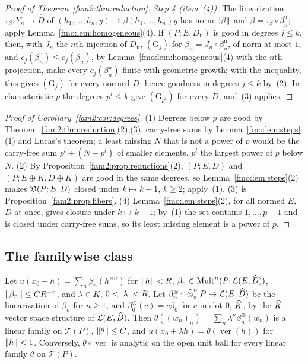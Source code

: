\begin{proof}[Proof of Theorem~\ref{fam2:thm:reduction}]
\emph{Step 4 (item~(4)).} The linearization $\tau_\beta\colon Y_n\to\widehat D$ of $(h_1,\dots,h_n,y)\mapsto
\beta(h_1,\dots,h_n)y$ has norm $\lVert \beta\rVert$ and $\beta=\tau_\beta\circ\beta^{\mathrm u}_n$; apply
Lemma~\ref{fmo:lem:homogeneous}(4). If $(P;E,D_{\mathrm u})$ is good in degrees $j\le k$, then, with $J_n$ the $n$th
injection of $D_{\mathrm u}$, $(\mathrm G_j)$ for $\beta_n=J_n\circ\beta^{\mathrm u}_n$, of norm at most $1$, and $c_j(\beta^{\mathrm u}_n)\le
c_j(\beta_n)$, by Lemma~\ref{fmo:lem:homogeneous}(4) with the $n$th projection, make every $c_j(\beta^{\mathrm u}_n)$ finite
with geometric growth; with the inequality, this gives $(\mathrm G_j)$ for every normed $D$, hence goodness in degrees
$j\le k$ by~(2). In characteristic $p$ the degrees $p^i\le k$ give $(\mathrm G_{p^i})$ for every $D$, and~(3) applies.
\end{proof}

\begin{proof}[Proof of Corollary~\ref{fam2:cor:degrees}]
(1) Degrees below $p$ are good by Theorem~\ref{fam2:thm:reduction}(2),(3), carry-free sums by Lemma~\ref{fmo:lem:steps}(1)
and Lucas's theorem; a least missing $N$ that is not a power of $p$ would be the carry-free sum $p^l+(N-p^l)$ of smaller
elements, $p^l$ the largest power of $p$ below $N$. (2) By Proposition~\ref{fam2:prop:reductions}(2), $(P;E,D)$ and
$(P;E\oplus K,D\oplus K)$ are good in the same degrees, so Lemma~\ref{fmo:lem:steps}(2) makes $\mathfrak D(P;E,D)$ closed under
$k\mapsto k-1$, $k\ge2$; apply~(1). (3) is Proposition~\ref{fam2:prop:fibers}. (4) Lemma~\ref{fmo:lem:steps}(2), for all
normed $E$, $D$ at once, gives closure under $k\mapsto k-1$; by~(1) the set contains $1,\dots,p-1$ and is closed under
carry-free sums, so its least missing element is a power of $p$.
\end{proof}

\subsection{The familywise class}\label{fmo:ssec:class}

\begin{lemma}\label{fmo:lem:germs}
Let $u(x_0+h)=\sum_n\beta_n(h^{\times n})$ for $\lVert h\rVert<R$, $\beta_n\in\operatorname{Mult}^n(P;\mathcal L(E,\widehat D))$,
$\lVert \beta_n\rVert\le CR^{-n}$, and $\lambda\in K$, $0<\lvert \lambda\rvert<R$. Let $\beta^\otimes_n\colon\mathbin{\widehat\otimes}^n_\pi P\to\mathcal L(E,\widehat D)$
be the linearization of $\beta_n$ for $n\ge1$, and $\beta^\otimes_0(c)=c\beta_0$ for $c$ in slot $0$, $\widehat K$, by the
$\widehat K$-vector space structure of $\mathcal L(E,\widehat D)$. Then $\theta((w_n)_n)=\sum_n\lambda^n\beta^\otimes_n(w_n)$ is a linear
family on $\mathcal T(P)$, $\lVert \theta\rVert\le C$, and $u(x_0+\lambda h)=\theta(\operatorname{ver}(h))$ for $\lVert h\rVert<1$.
Conversely, $\theta\circ\operatorname{ver}$ is analytic on the open unit ball for every linear family $\theta$ on
$\mathcal T(P)$.
\end{lemma}

